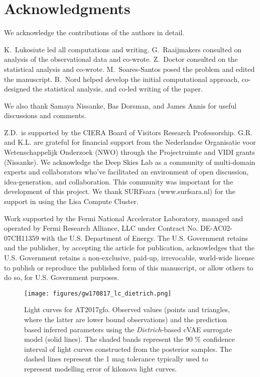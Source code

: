 \documentclass[fleqn,usenatbib,useAMS]{mnras}
\begin{document}
\section{Acknowledgments}
We acknowledge the contributions of the authors in detail.

K.~Lukosiute led all computations and writing.
G.~Raaijmakers consulted on analysis of the observational data and co-wrote.
Z.~Doctor consulted on the statistical analysis and co-wrote.
M.~Soares-Santos posed the problem and edited the manuscript.
B.~Nord helped develop the initial computational approach, co-designed the statistical analysis, and co-led writing of the paper.

We also thank Samaya Nissanke, Bas Dorsman, and James Annis for useful discussions and comments. 

Z.D.~is supported by the CIERA Board of Visitors Research Professorship.
G.R. and K.L. are grateful for financial support from the Nederlandse Organisatie voor Wetenschappelijk Onderzoek (NWO) through the Projectruimte and VIDI grants (Nissanke).
We acknowledge the Deep Skies Lab as a community of multi-domain experts and collaborators who’ve facilitated an environment of open discussion, idea-generation, and collaboration. This community was important for the development of this project.
We thank SURFsara (www.surfsara.nl) for the support in using the Lisa Compute Cluster.

Work supported by the Fermi National Accelerator Laboratory, managed and operated by Fermi Research Alliance, LLC under Contract No. DE-AC02-07CH11359 with the U.S. Department of Energy. The U.S. Government retains and the publisher, by accepting the article for publication, acknowledges that the U.S. Government retains a non-exclusive, paid-up, irrevocable, world-wide license to publish or reproduce the published form of this manuscript, or allow others to do so, for U.S. Government purposes.


\begin{figure}
    \centering
    \texttt{[image: figures/gw170817\_lc\_dietrich.png]}
    \caption{
    Light curves for AT2017gfo. 
    Observed values (points and triangles, where the latter are lower bound observations) and the prediction based inferred parameters using the \emph{Dietrich}-based cVAE surrogate model (solid lines). 
    The shaded bands represent the 90 \% confidence interval of light curves constructed from the posterior samples. 
    The dashed lines represent the 1 mag tolerance typically used to represent modelling error of kilonova light curves. }
    \label{fig:fit_lightcurve}
\end{figure}
\end{document}
